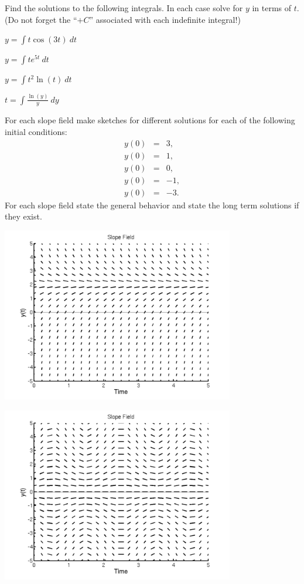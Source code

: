 \begin{problem}
\item Find the solutions to the following integrals. In each case
  solve for $y$ in terms of $t$. (Do not forget the ``$+C$''
  associated with each indefinite integral!)
  \begin{subproblem}
    \item $y = \int t\cos(3t) ~ dt$
      \vfill
    \item $y = \int t e^{5t} ~ dt$
      \vfill
    \item $y = \int t^2 \ln(t) ~ dt$
      \vfill
    \item $t = \int \frac{\ln(y)}{y} ~ dy$
      \vfill
  \end{subproblem}

\clearpage

\item For each slope field make sketches for different solutions for
  each of the following initial conditions:
  \begin{eqnarray*}
    y(0) & = & 3, \\
    y(0) & = & 1, \\
    y(0) & = & 0, \\
    y(0) & = & -1, \\
    y(0) & = & -3.
  \end{eqnarray*}
  For each slope field state the general behavior and state the long
  term solutions if they exist.

  \begin{subproblem}
    \item \includegraphics[height=3.0in]{img/sfSteadyWk1}
    \item \includegraphics[height=3.0in]{img/sfOscillateWk1}


\end{subproblem}
\end{problem}
